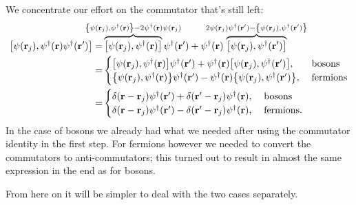 \documentclass[11pt,letter, swedish, english
]{article}
\begin{document}
We concentrate our effort on the commutator that's still left:
\begin{equation}
\begin{aligned}
\comm{\psi(\vb{r}_j)}{\psi^\dagger(\vb{r})\psi^\dagger(\vb{r}')}
=&\hspace{-20pt}\overbrace{
\comm{\psi(\vb{r}_j)}{\psi^\dagger(\vb{r})}
}^{\acomm{\psi(\vb{r}_j)}{\psi^\dagger(\vb{r})}-2\psi^\dagger(\vb{r})\psi(\vb{r}_j)}
\hspace{-20pt}\psi^\dagger(\vb{r}')
+\psi^\dagger(\vb{r})
\hspace{-20pt}\overbrace{
\comm{\psi(\vb{r}_j)}{\psi^\dagger(\vb{r}')}
}^{2\psi(\vb{r}_j)\psi^\dagger(\vb{r}')-\acomm{\psi(\vb{r}_j)}{\psi^\dagger(\vb{r}')}}
\\%
=&
\begin{cases}
\comm{\psi(\vb{r}_j)}{\psi^\dagger(\vb{r})}\psi^\dagger(\vb{r}')
+\psi^\dagger(\vb{r})\comm{\psi(\vb{r}_j)}{\psi^\dagger(\vb{r}')}
,&\text{bosons}\\
\acomm{\psi(\vb{r}_j)}{\psi^\dagger(\vb{r})}\psi^\dagger(\vb{r}')
-\psi^\dagger(\vb{r})\acomm{\psi(\vb{r}_j)}{\psi^\dagger(\vb{r}')}
,\;&\text{fermions}
\end{cases}\\
=&
\begin{cases}
\delta(\vb{r}-\vb{r}_j) \psi^\dagger(\vb{r}')
+\delta(\vb{r}'-\vb{r}_j)\psi^\dagger(\vb{r})
,&\text{bosons}\\
\delta(\vb{r}-\vb{r}_j) \psi^\dagger(\vb{r}')
-\delta(\vb{r}'-\vb{r}_j)\psi^\dagger(\vb{r})
,\;&\text{fermions}.
\end{cases}
\end{aligned}
\end{equation}
In the case of bosons we already had what we needed after using the
commutator identity in the first step. For fermions however we needed
to convert the commutators to anti-commutators; this turned out to
result in almost the same expression in the end as for bosons.

From here on it will be simpler to deal with the two cases separately.
\end{document}
